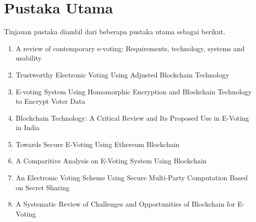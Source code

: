 \documentclass[12pt, a4paper, final]{article}
\begin{document}
\newpage
\section*{Pustaka Utama}

Tinjauan pustaka diambil dari beberapa pustaka utama sebagai berikut.

\begin{enumerate}
    \setlength\itemsep{-0.5em}
    \item \cite{wang2017review} A review of contemporary e-voting: Requirements, technology, systems and usability
    \item \cite{8651451} Trustworthy Electronic Voting Using Adjusted Blockchain Technology
    \item \cite{koreanevoting} E-voting System Using Homomorphic Encryption and Blockchain Technology to Encrypt Voter Data
    \item \cite{blockchainreview} Blockchain Technology: A Critical Review and Its Proposed Use in E-Voting in India
    \item \cite{blockchain} Towards Secure E-Voting Using Ethereum Blockchain
    \item \cite{comparitiveanalysis} A Comparitive Analysis on E-Voting System Using Blockchain
    \item \cite{secretsharing} An Electronic Voting Scheme Using Secure Multi-Party Computation Based on Secret Sharing
    \item \cite{sysreview} A Systematic Review of Challenges and Opportunities of Blockchain for E-Voting
\end{enumerate}



\end{document}
